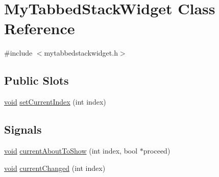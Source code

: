 \hypertarget{class_my_tabbed_stack_widget}{\section{\-My\-Tabbed\-Stack\-Widget \-Class \-Reference}
\label{class_my_tabbed_stack_widget}
}


{\ttfamily \#include $<$mytabbedstackwidget.\-h$>$}

\subsection*{\-Public \-Slots}
\begin{DoxyCompactItemize}
\item 
\hyperlink{group___u_a_v_objects_plugin_ga444cf2ff3f0ecbe028adce838d373f5c}{void} \hyperlink{class_my_tabbed_stack_widget_a9e3c968779227ca412735073b437fdf1}{set\-Current\-Index} (int index)
\end{DoxyCompactItemize}
\subsection*{\-Signals}
\begin{DoxyCompactItemize}
\item 
\hyperlink{group___u_a_v_objects_plugin_ga444cf2ff3f0ecbe028adce838d373f5c}{void} \hyperlink{class_my_tabbed_stack_widget_a9f0e64fce4a1b4f26e9aa6fee22ab7f5}{current\-About\-To\-Show} (int index, bool $\ast$proceed)
\item 
\hyperlink{group___u_a_v_objects_plugin_ga444cf2ff3f0ecbe028adce838d373f5c}{void} \hyperlink{class_my_tabbed_stack_widget_ab4617839c400d58c804ba6b86dc33cc1}{current\-Changed} (int index)
\end{DoxyCompactItemize}

